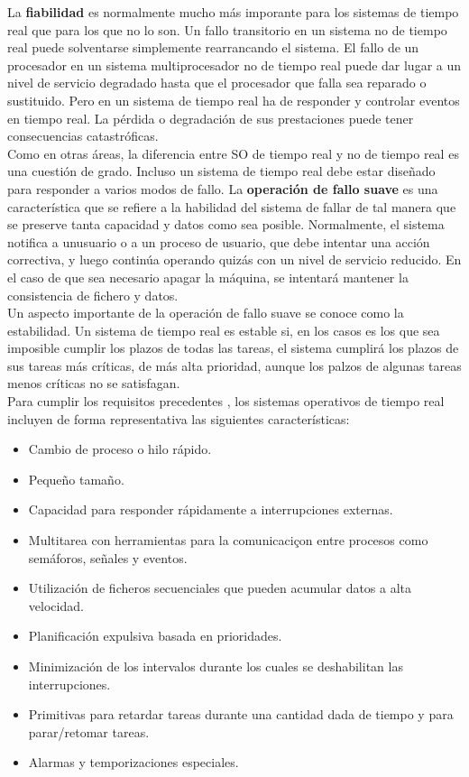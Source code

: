 \documentclass{article}
\begin{document}
				La \textbf{fiabilidad} es normalmente mucho más imporante para los sistemas de tiempo real que para los que no lo son. Un fallo transitorio en un sistema no de tiempo real puede solventarse simplemente rearrancando el sistema. El fallo de un procesador en un sistema multiprocesador no de tiempo real puede dar lugar a un nivel de servicio degradado hasta que el procesador que falla sea reparado o sustituido. Pero en un sistema de tiempo real ha de responder y controlar eventos en tiempo real. La pérdida o degradación de sus prestaciones puede tener consecuencias catastróficas. \\
				
				Como en otras áreas, la diferencia entre SO de tiempo real y no de tiempo real es una cuestión de grado. Incluso un sistema de tiempo real debe estar diseñado para responder a varios modos de fallo. La \textbf{operación de fallo suave} es una característica que se refiere a la habilidad del sistema de fallar de tal manera que se preserve tanta capacidad y datos como sea posible. Normalmente, el sistema notifica a unusuario o a un proceso de usuario, que debe intentar una acción correctiva, y luego continúa operando quizás con un nivel de servicio reducido. En el caso de que sea necesario apagar la máquina, se intentará mantener la consistencia de fichero y datos. \\
				
				Un aspecto importante de la operación de fallo suave se conoce como la estabilidad. Un sistema de tiempo real es estable si, en los casos es los que sea imposible cumplir los plazos de todas las tareas, el sistema cumplirá los plazos de sus tareas más críticas, de más alta prioridad, aunque los palzos de algunas tareas menos críticas no se satisfagan. \\
				
				Para cumplir los requisitos precedentes , los sistemas operativos de tiempo real incluyen de forma representativa las siguientes características:
				
				\begin{itemize}
				\item Cambio de proceso o hilo rápido.
				\item Pequeño tamaño.
				\item Capacidad para responder rápidamente a interrupciones externas.
				\item Multitarea con herramientas para la comunicaciçon entre procesos como semáforos, señales y eventos.
				\item Utilización de ficheros secuenciales que pueden acumular datos a alta velocidad.
				\item Planificación expulsiva basada en prioridades.
				\item Minimización de los intervalos durante los cuales se deshabilitan las interrupciones.
				\item Primitivas para retardar tareas durante una cantidad dada de tiempo y para parar/retomar tareas. 
				\item Alarmas y temporizaciones especiales.
				\end{itemize}
				
\end{document}

